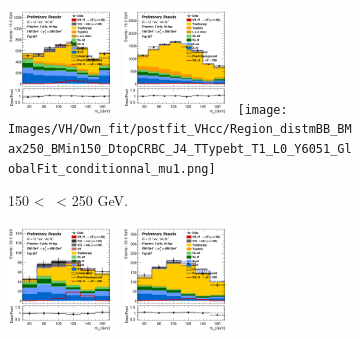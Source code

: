 \begin{figure}[h!]
    \centering
    \begin{subfigure}[b]{\textwidth}
        \centering
        \includegraphics[width=0.32\textwidth]{Images/VH/Own_fit/postfit_VHcc/Region_distmBB_BMax250_BMin150_DtopCRBC_J2_TTypebt_T1_L0_Y6051_GlobalFit_conditionnal_mu1.png}
        \includegraphics[width=0.32\textwidth]{Images/VH/Own_fit/postfit_VHcc/Region_distmBB_BMax250_BMin150_DtopCRBC_J3_TTypebt_T1_L0_Y6051_GlobalFit_conditionnal_mu1.png}
        \texttt{[image: Images/VH/Own\_fit/postfit\_VHcc/Region\_distmBB\_BMax250\_BMin150\_DtopCRBC\_J4\_TTypebt\_T1\_L0\_Y6051\_GlobalFit\_conditionnal\_mu1.png]}
        \caption{150 < \ptv\ < 250 GeV.}
        \label{fig:plots_VHcc_OL_150_TopCR_2c}
    \end{subfigure}
    \begin{subfigure}[b]{\textwidth}
        \centering
        \includegraphics[width=0.32\textwidth]{Images/VH/Own_fit/postfit_VHcc/Region_distmBB_BMax400_BMin250_DtopCRBC_J2_TTypebt_T1_L0_Y6051_GlobalFit_conditionnal_mu1.png}
        \includegraphics[width=0.32\textwidth]{Images/VH/Own_fit/postfit_VHcc/Region_distmBB_BMax400_BMin250_DtopCRBC_J3_TTypebt_T1_L0_Y6051_GlobalFit_conditionnal_mu1.png}

\end{subfigure}
\end{figure}
